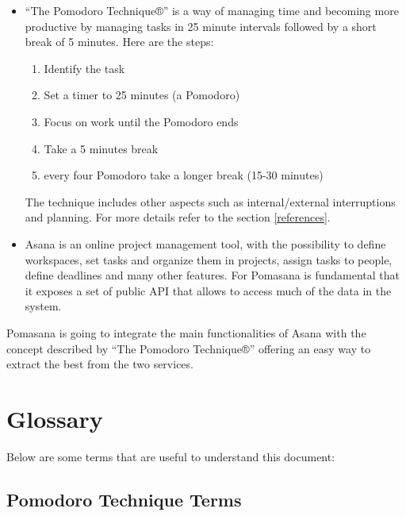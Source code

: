		\begin{itemize}

				\item “The Pomodoro Technique®” is a way of managing time and becoming more productive by managing tasks in 25 minute intervals followed by a short break of 5 minutes.	Here are the steps:

					\begin{enumerate}

						\item Identify the task

						\item Set a timer to 25 minutes (a Pomodoro)

						\item Focus on work until the Pomodoro ends

						\item Take a 5 minutes break

						\item every four Pomodoro take a longer break (15-30 minutes)

					\end{enumerate}

				The technique includes other aspects such as internal/external interruptions and planning. For more details refer to the section \ref{references}. 
				
				\item Asana is an online project management tool, with the possibility to define workspaces, set tasks and organize them in projects, assign tasks to people, define deadlines and many other features. 
				For Pomasana is fundamental that it exposes a set of public API that allows to access much of the data in the system.

		\end{itemize}

		Pomasana is going to integrate the main functionalities of Asana with the concept described by “The Pomodoro Technique®” offering an easy way to extract the best from the two services.



\section{Glossary}
Below are some terms that are useful to understand this document:

	\subsection{Pomodoro Technique Terms}

